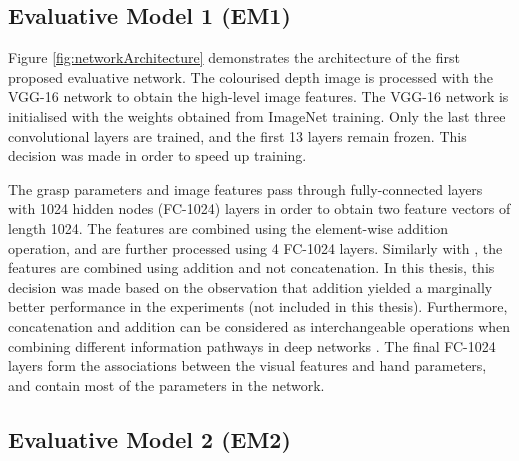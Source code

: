 \subsection{Evaluative Model 1 (EM1)}

Figure \ref{fig:networkArchitecture} demonstrates the architecture of the first proposed evaluative network. The colourised depth image is processed with the VGG-16 network \cite{Simonyan14c} to obtain the high-level image features. The VGG-16 network is initialised with the weights obtained from ImageNet training. Only the last three convolutional layers are trained, and the first 13 layers remain frozen. This decision was made in order to speed up training.

The grasp parameters and image features pass through fully-connected layers with 1024 hidden nodes (FC-1024) layers in order to obtain two feature vectors of length 1024. The features are combined using the element-wise addition operation, and are further processed using 4 FC-1024 layers. Similarly with \cite{Levine1}, the features are combined using addition and not concatenation. In this thesis, this decision was made based on the observation that addition yielded a marginally better performance in the experiments (not included in this thesis). Furthermore, concatenation and addition can be considered as interchangeable operations when combining different information pathways in deep networks \cite{dumoulin2018feature-wise}. The final FC-1024 layers form the associations between the visual features and hand parameters, and contain most of the parameters in the network. 

\subsection{Evaluative Model 2 (EM2)}



